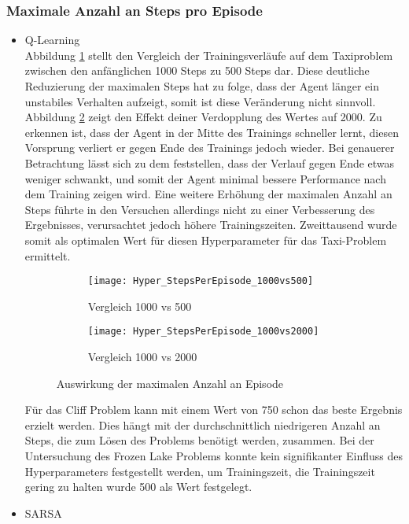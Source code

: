 \subsubsection{Maximale Anzahl an Steps pro Episode}
\begin{itemize}
    \item Q-Learning\\
    Abbildung \ref{fig:MaxStepCount_1000vs500} stellt den Vergleich der Trainingsverläufe auf dem Taxiproblem zwischen den anfänglichen 1000 Steps zu 500 Steps dar.
    Diese deutliche Reduzierung der maximalen Steps hat zu folge, dass der Agent länger ein unstabiles Verhalten aufzeigt, somit ist diese Veränderung nicht sinnvoll.
    Abbildung \ref{fig:MaxStepCount_1000vs2000} zeigt den Effekt deiner Verdopplung des Wertes auf 2000. Zu erkennen ist, dass der Agent in der Mitte des Trainings schneller lernt, diesen Vorsprung verliert er gegen Ende des Trainings jedoch wieder.
    Bei genauerer Betrachtung lässt sich zu dem feststellen, dass der Verlauf gegen Ende etwas weniger schwankt, und somit der Agent minimal bessere Performance nach dem Training zeigen wird. 
    Eine weitere Erhöhung der maximalen Anzahl an Steps führte in den Versuchen allerdings nicht zu einer Verbesserung des Ergebnisses, verursachtet jedoch höhere Trainingszeiten.
    Zweittausend wurde somit als optimalen Wert für diesen Hyperparameter für das Taxi-Problem ermittelt. 

    \begin{figure}[H]
        \centering
        \begin{subfigure}{.5\textwidth}
          \centering
          \texttt{[image: Hyper\_StepsPerEpisode\_1000vs500]}
          \caption{Vergleich 1000 vs 500}
          \label{fig:MaxStepCount_1000vs500}
        \end{subfigure}%
        \begin{subfigure}{.5\textwidth}
          \centering
          \texttt{[image: Hyper\_StepsPerEpisode\_1000vs2000]}
          \caption{Vergleich 1000 vs 2000}
          \label{fig:MaxStepCount_1000vs2000}
        \end{subfigure}
        \caption{Auswirkung der maximalen Anzahl an Episode}
        \label{fig:MaxStepCount}
    \end{figure}

    Für das Cliff Problem kann mit einem Wert von 750 schon das beste Ergebnis erzielt werden. 
    Dies hängt mit der durchschnittlich niedrigeren Anzahl an Steps, die zum Lösen des Problems benötigt werden, zusammen. 
    Bei der Untersuchung des Frozen Lake Problems konnte kein signifikanter Einfluss des Hyperparameters festgestellt werden, um Trainingszeit, die Trainingszeit gering zu halten wurde 500 als Wert festgelegt.
    \item SARSA\\

\end{itemize}

